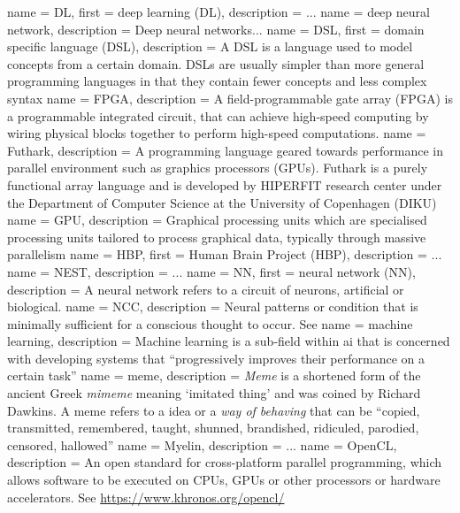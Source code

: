 {
  name = {DL},
  first = {deep learning (DL)},
  description = {...}
}
 {
  name = {deep neural network},
  description = {Deep neural networks...}
}
 {
  name = {DSL},
  first = {domain specific language (DSL)},
  description = {A DSL is a language used to model concepts from a certain
    domain. DSLs are usually simpler than more general programming languages in
    that they contain fewer concepts and less complex syntax}
}
 {
  name = {FPGA},
  description = {A field-programmable gate array (FPGA) is a programmable
		 integrated circuit, that can achieve high-speed computing
		 by wiring physical blocks together to perform high-speed
		 computations.}
}
 {
   name = {Futhark},
   description = {A programming language geared towards performance in parallel environment such as
   graphics processors (GPUs). Futhark is a purely functional array language and is
   developed by HIPERFIT research center under the Department of Computer Science at the
   University of Copenhagen (DIKU)}
}
 {
  name = GPU,
  description = {Graphical processing units which are specialised processing units
                 tailored to process graphical data, typically through massive parallelism}
}
 {
  name = HBP,
  first = {Human Brain Project (HBP)},
  description = {...}
}
 {
  name = NEST,
  description = {...}
}
 {
  name = {NN},
  first = {neural network (NN)},
  description = {A neural network refers to a circuit of neurons, artificial or biological.}
}
 {
   name = {NCC},
   description = {Neural patterns or condition that is minimally sufficient for a conscious
thought to occur. See \autocite{atkinson2000, Hohwy2009}}
}
 {
  name = machine learning,
  description = {Machine learning is a sub-field within \gls{ai} that is concerned
    with developing systems that ``progressively improves their performance on a
    certain task'' \autocite{wiki:ml}}
}
 {
name = meme,
description = {\textit{Meme} is a shortened form of the ancient Greek \textit{mimeme} meaning
`imitated thing' and was coined by Richard Dawkins. A meme refers to a idea or a
\textit{way of behaving} that can be \enquote{copied, transmitted, remembered, taught, shunned,
brandished, ridiculed, parodied, censored, hallowed} \autocite{dennett2017}}
}
 {
  name = Myelin,
  description = {...}
}
 {
   name = {OpenCL},
   description = {An open standard for cross-platform parallel programming, which
   allows software to be executed on CPUs, GPUs or other processors or hardware accelerators. See \url{
   https://www.khronos.org/opencl/}}
}
